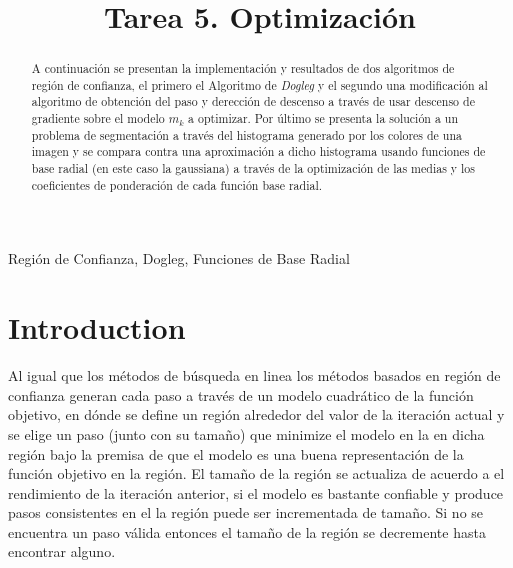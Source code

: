 \documentclass[conference]{IEEEtran}
\begin{document}
\title{Tarea 5. Optimización}

\author{
}

\maketitle

\begin{abstract}
A continuación se presentan la implementación y resultados de dos algoritmos de región de confianza,
el primero el Algoritmo de \textit{Dogleg} y el segundo una modificación al algoritmo de obtención del paso
y derección de descenso a través de usar descenso de gradiente sobre el modelo $m_k$ a optimizar.
Por último se presenta la solución a un problema de segmentación a través del histograma generado
por los colores de una imagen y se compara contra una aproximación a dicho histograma usando
funciones de base radial (en este caso la gaussiana) a través de la optimización de las medias y los
coeficientes de ponderación de cada función base radial.


\end{abstract}

\begin{IEEEkeywords}
Región de Confianza, Dogleg, Funciones de Base Radial
\end{IEEEkeywords}

\section{Introduction}

Al igual que los métodos de búsqueda en linea los métodos basados en región de confianza generan
cada paso a través de un modelo cuadrático de la función objetivo, en dónde se define un región
alrededor del valor de la iteración actual y se elige un paso (junto con su tamaño) que minimize el
modelo en la en dicha región bajo la premisa de que el modelo es una buena representación de la
función objetivo en la región. El tamaño de la región se actualiza de acuerdo a el rendimiento de la
iteración anterior, si el modelo es bastante confiable y produce pasos consistentes en el la región
puede ser incrementada de tamaño. Si no se encuentra un paso válida entonces el tamaño de la región
se decremente hasta encontrar alguno\cite{b1}.\\
\end{document}
